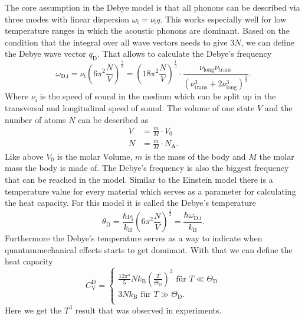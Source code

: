 The core assumption in the Debye model is that all phonons can be described via three modes with linear dispersion $\omega_\text{i} = \nu_\text{i} q$.
This works especially well for low temperature ranges in which the acoustic phonons are dominant.
Based on the condition that the integral over all wave vectors needs to give $3N$, we can define the Debye wave vector $q_\text{D}$.
That allows to calculate the Debye's frequency
\begin{equation}
    \omega_\text{D,i} = \nu_\text{i} \left(6 \pi^2 \frac{N}{V} \right)^{\frac{1}{3}} = \left(18 \pi^2 \frac{N}{V} \right)^{\frac{1}{3}} \cdot \frac{\nu_\text{long} \nu_\text{trans}}{\left( \nu_\text{trans}^3 +  2 \nu_\text{long}^3  \right)^{\frac{1}{3}}}.
    \label{eq:debye_freq}
\end{equation}
Where $\nu_\text{i}$ is the speed of sound in the medium which can be split up in the transversal and longitudinal speed of sound.
The volume of one state $V$ and the number of atoms $N$ can be described as
\begin{align}
    V &= \frac{m}{M} \cdot V_0\\ 
    N &= \frac{m}{M} \cdot N_\text{A}.
\end{align}
Like above $V_0$ is the molar Volume, $m$ is the mass of the body and $M$ the molar mass the body is made of.
The Debye's frequency is also the biggest frequency that can be reached in the model.
Similar to the Einstein model there is a temperature value for every material which serves as a parameter for calculating the heat capacity.
For this model it is called the Debye's temperature
\begin{equation}
    \theta_\text{D} = \frac{\hbar \nu_\text{i}}{k_\text{B}} \left(6 \pi^2 \frac{N}{V} \right)^{\frac{1}{3}} = \frac{\hbar \omega_\text{D,i}}{k_\text{B}}.
    \label{eq:debye_temp}
\end{equation}
Furthermore the Debye's temperature serves as a way to indicate when quantummechanical effects starts to get dominant. 
With that we can define the heat capacity
\begin{equation}
    C_\text{V}^\text{D} =
      \begin{cases}
        \frac{12 \pi ^4}{5} N k_\text{B} \left( \frac{T}{\Theta_\text{D}}   \right)^3 \,\, \text{für} \,\,  T \ll \Theta_\text{D}\\
        3 N k_\text{B} \,\, \text{für} \,\, T \gg \Theta_\text{D}.\\
        \end{cases}
        \label{eq:debyec}
\end{equation}
Here we get the $T^3$ result that was observed in experiments.